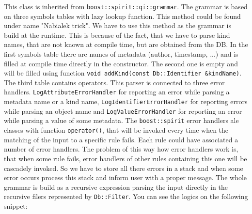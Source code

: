 \documentclass[deska]{subfiles}
\begin{document}
This class is inherited from {\tt boost::spirit::qi::grammar}. The grammar is based on three symbols tables with lazy lookup
function. This method could be found under name "Nabialek trick". We have to use this method as the grammar is build at
the runtime. This is because of the fact, that we have to parse kind names, that are not known at compile time, but are obtained
from the DB. In the first symbols table there are names of metadata (author, timestamp, ...) and is filled at compile time
directly in the constructor. The second one is empty and will be filled using function {\tt void addKind(const Db::Identifier \&kindName)}.
The third table contains operators. This parser is connected to three error handlers. {\tt LogAttributeErrorHandler}
for reporting an error while parsing a metadata name or a kind name, {\tt LogIdentifierErrorHandler} for reporting errors
while parsing an object name and {\tt LogValueErrorHandler} for reporting an error while parsing a value of some
metadata. The {\tt boost::spirit} error handlers ale classes with function {\tt operator()}, that will be invoked every time
when the matching of the input to a specific rule fails. Each rule could have associated a number of error handlers. The
problem of this way how error handlers work is, that when some rule fails, error handlers of other rules containing this one
will be cascadely invoked. So we have to store all there errors in a stack and when some error occurs process this stack
and inform user with a proper message. The whole grammar is build as a recursive expression parsing the input directly in the
recursive filers represented by {\tt Db::Filter}. You can see the logics on the following snippet:
\end{document}

